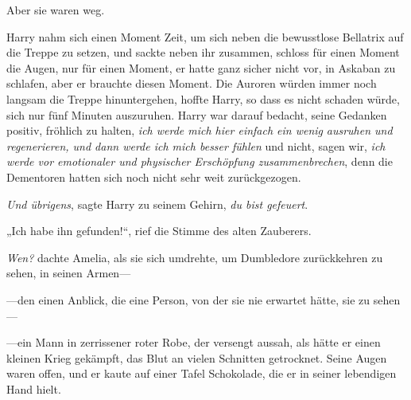 Aber sie waren weg.

Harry nahm sich einen Moment Zeit, um sich neben die bewusstlose Bellatrix auf die Treppe zu setzen, und sackte neben ihr zusammen, schloss für einen Moment die Augen, nur für einen Moment, er hatte ganz sicher nicht vor, in Askaban zu schlafen, aber er brauchte diesen Moment. Die Auroren würden immer noch langsam die Treppe hinuntergehen, hoffte Harry, so dass es nicht schaden würde, sich nur fünf Minuten auszuruhen. Harry war darauf bedacht, seine Gedanken positiv, fröhlich zu halten, \emph{ich werde mich hier einfach ein wenig} \emph{ausruhen und} \emph{regenerieren, und dann werde ich mich besser fühlen} und nicht, sagen wir, \emph{ich werde vor emotionaler und physischer Erschöpfung zusammenbrechen}, denn die Dementoren hatten sich noch nicht sehr weit zurückgezogen.

\emph{Und übrigens}, sagte Harry zu seinem Gehirn, \emph{du bist gefeuert}.

\later

„Ich habe ihn gefunden!“, rief die Stimme des alten Zauberers.

\emph{Wen?} dachte Amelia, als sie sich umdrehte, um Dumbledore zurückkehren zu sehen, in seinen Armen—

—den einen Anblick, die eine Person, von der sie nie erwartet hätte, sie zu sehen—

—ein Mann in zerrissener roter Robe, der versengt aussah, als hätte er einen kleinen Krieg gekämpft, das Blut an vielen Schnitten getrocknet. Seine Augen waren offen, und er kaute auf einer Tafel Schokolade, die er in seiner lebendigen Hand hielt.

